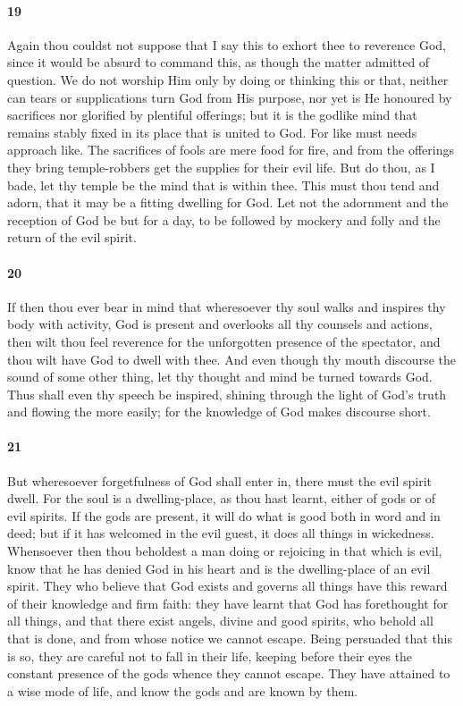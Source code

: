 \documentclass[12pt]{article}
\begin{document}
\paragraph{19} Again thou couldst not suppose that I say this to exhort thee to
reverence God, since it would be absurd to command this, as though the matter
admitted of question. We do not worship Him only by doing or thinking this or
that, neither can tears or supplications turn God from His purpose, nor yet is
He honoured by sacrifices nor glorified by plentiful offerings; but it is the
godlike mind that remains stably fixed in its place that is united to God. For
like must needs approach like. The sacrifices of fools are mere food for fire,
and from the offerings they bring temple-robbers get the supplies for their
evil life. But do thou, as I bade, let thy temple be the mind that is within
thee. This must thou tend and adorn, that it may be a fitting dwelling for God.
Let not the adornment and the reception of God be but for a day, to be followed
by mockery and folly and the return of the evil spirit.

\paragraph{20} If then thou ever bear in mind that wheresoever thy soul walks
and inspires thy body with activity, God is present and overlooks all thy
counsels and actions, then wilt thou feel reverence for the unforgotten
presence of the spectator, and thou wilt have God to dwell with thee. And even
though thy mouth discourse the sound of some other thing, let thy thought and
mind be turned towards God. Thus shall even thy speech be inspired, shining
through the light of God's truth and flowing the more easily; for the knowledge
of God makes discourse short.

\paragraph{21} But wheresoever forgetfulness of God shall enter in, there must
the evil spirit dwell. For the soul is a dwelling-place, as thou hast learnt,
either of gods or of evil spirits. If the gods are present, it will do what is
good both in word and in deed; but if it has welcomed in the evil guest, it
does all things in wickedness. Whensoever then thou beholdest a man doing or
rejoicing in that which is evil, know that he has denied God in his heart and
is the dwelling-place of an evil spirit. They who believe that God exists and
governs all things have this reward of their knowledge and firm faith: they
have learnt that God has forethought for all things, and that there exist
angels, divine and good spirits, who behold all that is done, and from whose
notice we cannot escape. Being persuaded that this is so, they are careful not
to fall in their life, keeping before their eyes the constant presence of the
gods whence they cannot escape. They have attained to a wise mode of life, and
know the gods and are known by them.
\end{document}
